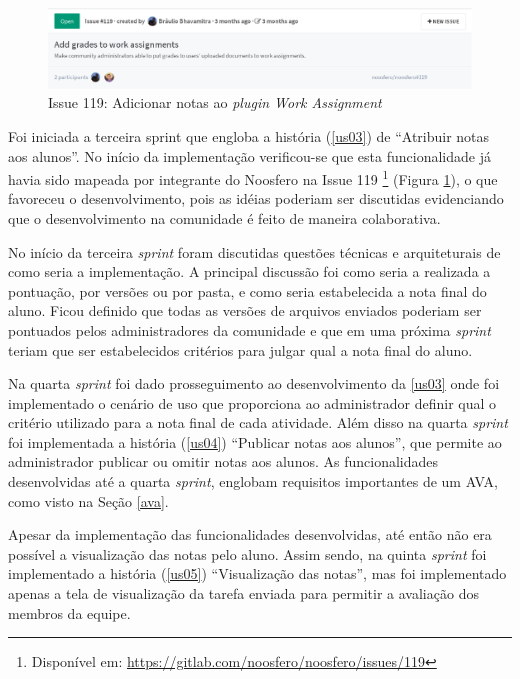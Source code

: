 \begin{figure}[h]
    \centering
    \includegraphics[keepaspectratio=true,scale=0.4]
      {figuras/issue119.eps}
    \caption{Issue 119: Adicionar notas ao \textit{plugin Work Assignment}}
    \label{fig:issue-119}
\end{figure}

Foi iniciada a terceira sprint que engloba a história (\ref{us03}) de ``Atribuir notas aos alunos''. No início da implementação verificou-se que esta funcionalidade já havia sido mapeada por integrante do Noosfero na Issue 119 \footnote{Disponível em: \url{https://gitlab.com/noosfero/noosfero/issues/119}} (Figura \ref{fig:issue-119}), o que favoreceu o desenvolvimento, pois as idéias poderiam ser discutidas evidenciando que o desenvolvimento na comunidade é feito de maneira colaborativa.

No início da terceira \textit{sprint} foram discutidas questões técnicas e arquiteturais de como seria a implementação. A principal discussão foi como seria a realizada a pontuação, por versões ou por pasta, e como seria estabelecida a nota final do aluno. Ficou definido que todas as versões de arquivos enviados poderiam ser pontuados pelos administradores da comunidade e que em uma próxima \textit{sprint} teriam que ser estabelecidos critérios para julgar qual a nota final do aluno.

Na quarta \textit{sprint} foi dado prosseguimento ao desenvolvimento da \ref{us03} onde foi implementado o cenário de uso que proporciona ao administrador definir qual o critério utilizado para a nota final de cada atividade.  Além disso na quarta \textit{sprint} foi implementada a história (\ref{us04}) ``Publicar notas aos alunos'', que permite ao administrador publicar ou omitir notas aos alunos. As funcionalidades desenvolvidas até a quarta \textit{sprint}, englobam requisitos importantes de um AVA, como visto na Seção \ref{ava}.

Apesar da implementação das funcionalidades desenvolvidas, até então não era possível a visualização das notas pelo aluno. Assim sendo, na quinta \textit{sprint} foi implementado a história (\ref{us05}) ``Visualização das notas'', mas foi implementado apenas a tela de visualização da tarefa enviada para permitir a avaliação dos membros da equipe.


